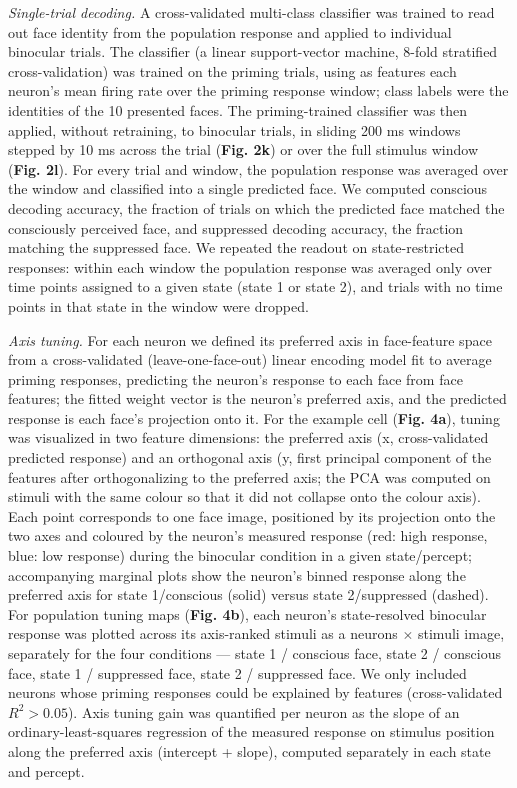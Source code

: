 \documentclass{article}
\begin{document}
\textit{Single-trial decoding.} A cross-validated multi-class classifier was trained to read out face identity from the population response and applied to individual binocular trials. The classifier (a linear support-vector machine, 8-fold stratified cross-validation) was trained on the priming trials, using as features each neuron's mean firing rate over the priming response window; class labels were the identities of the 10 presented faces. The priming-trained classifier was then applied, without retraining, to binocular trials, in sliding 200 ms windows stepped by 10 ms across the trial (\textbf{Fig. 2k}) or over the full stimulus window (\textbf{Fig. 2l}). For every trial and window, the population response was averaged over the window and classified into a single predicted face. We computed conscious decoding accuracy, the fraction of trials on which the predicted face matched the consciously perceived face, and suppressed decoding accuracy, the fraction matching the suppressed face. We repeated the readout on state-restricted responses: within each window the population response was averaged only over time points assigned to a given state (state 1 or state 2), and trials with no time points in that state in the window were dropped.

\textit{Axis tuning.} For each neuron we defined its preferred axis in face-feature space from a cross-validated (leave-one-face-out) linear encoding model fit to average priming responses, predicting the neuron's response to each face from face features; the fitted weight vector is the neuron's preferred axis, and the predicted response is each face's projection onto it. For the example cell (\textbf{Fig. 4a}), tuning was visualized in two feature dimensions: the preferred axis (x, cross-validated predicted response) and an orthogonal axis (y, first principal component of the features after orthogonalizing to the preferred axis; the PCA was computed on stimuli with the same colour so that it did not collapse onto the colour axis). Each point corresponds to one face image, positioned by its projection onto the two axes and coloured by the neuron's measured response (red: high response, blue: low response) during the binocular condition in a given state/percept; accompanying marginal plots show the neuron's binned response along the preferred axis for state 1/conscious (solid) versus state 2/suppressed (dashed). For population tuning maps (\textbf{Fig. 4b}), each neuron's state-resolved binocular response was plotted across its axis-ranked stimuli as a neurons $\times$ stimuli image, separately for the four conditions --- state 1 / conscious face, state 2 / conscious face, state 1 / suppressed face, state 2 / suppressed face. We only included neurons whose priming responses could be explained by features (cross-validated $R^2 > 0.05$). Axis tuning gain was quantified per neuron as the slope of an ordinary-least-squares regression of the measured response on stimulus position along the preferred axis (intercept + slope), computed separately in each state and percept.
\end{document}
